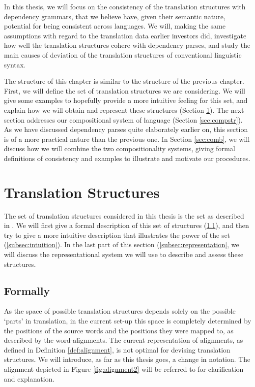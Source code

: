 \documentclass{report}
\theoremstyle{break}
\begin{document}
In this thesis, we will focus on the consistency of the translation structures with dependency grammars, that we believe have, given their semantic nature, potential for being consistent across languages. We will, making the same assumptions with regard to the translation data earlier investors did, investigate how well the translation structures cohere with dependency parses, and study the main causes of deviation of the translation structures of conventional linguistic syntax.

The structure of this chapter is similar to the structure of the previous chapter. First, we will define the set of translation structures we are considering. We will give some examples to hopefully provide a more intuitive feeling for this set, and explain how we will obtain and represent these structures (Section \ref{sec:transstr}). The next section addresses our compositional system of language (Section \ref{sec:compstr}). As we have discussed dependency parses quite elaborately earlier on, this section is of a more practical nature than the previous one. In Section \ref{sec:comb}, we will discuss how we will combine the two compositionality systems, giving formal definitions of consistency and examples to illustrate and motivate our procedures.


\section{Translation Structures}
\label{sec:transstr}

The set of translation structures considered in this thesis is the set as described in \cite{simaan2013hats}. We will first give a formal description of this set of structures (\ref{subsec:hats}), and then try to give a more intuitive description that illustrates the power of the set (\ref{subsec:intuition}). In the last part of this section (\ref{subsec:representation}, we will discuss the representational system we will use to describe and assess these structures.

\subsection{Formally}
\label{subsec:hats}

As the space of possible translation structures depends solely on the possible `parts' in translation, in the current set-up this space is completely determined by the positions of the source words and the positions they were mapped to, as described by the word-alignments. The current representation of alignments, as defined in Definition \ref{def:alignment}, is not optimal for devising translation structures. We will introduce, as far as this thesis goes, a change in notation. The alignment depicted in Figure \ref{fig:alignment2} will be referred to for clarification and explanation.
\end{document}
